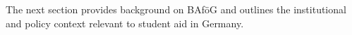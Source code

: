 


The next section provides background on BAföG and outlines the institutional and policy context relevant to student aid in Germany.

